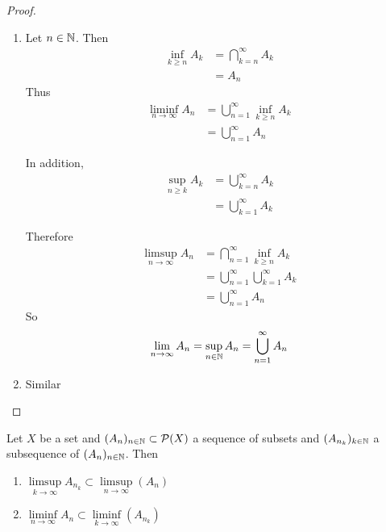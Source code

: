 \documentclass{book}
\begin{document}
	\begin{proof}\
		\begin{enumerate}
			\item Let $n \in \mathbb{N}$. Then 
			\begin{align*}
				\inf\limits_{k \geq n}A_k 
				&= \bigcap\limits_{k=n}^{\infty}A_k \\
				&= A_n
			\end{align*}
			Thus 
			\begin{align*}
				\liminf\limits_{n \rightarrow \infty}A_n 
				&= \bigcup\limits_{n=1}^{\infty} \inf\limits_{k \geq n}A_k \\
				&= \bigcup\limits_{n=1}^{\infty} A_n 
			\end{align*}  
			
			In addition,  
			\begin{align*}
				\sup\limits_{n \geq k} A_k 
				&= \bigcup_{k=n}^{\infty}A_k \\
				&= \bigcup_{k=1}^{\infty}A_k 
			\end{align*}
			
			Therefore 
			\begin{align*}
				\limsup\limits_{n \rightarrow \infty}A_n 
				&= \bigcap\limits_{n=1}^{\infty} \inf\limits_{k \geq n}A_k \\
				&= \bigcup\limits_{n=1}^{\infty} \bigcup_{k=1}^{\infty}A_k  \\
				&= \bigcup_{n=1}^{\infty}A_n
			\end{align*}
			So $$\lim\limits_{n \rightarrow \infty} A_n = \sup\limits_{n \in \mathbb{N}}A_n = \bigcup_{n =1}^{\infty}A_n$$
			
			\item Similar
		\end{enumerate}
	\end{proof}
	
	\begin{ex}  
		Let $X$ be a set and $(A_n)_{n \in \mathbb{N}} \subset \mathcal{P}(X)$ a sequence of subsets and $(A_{n_k})_{k \in \mathbb{N}}$ a subsequence of $(A_n)_{n \in \mathbb{N}}$. Then 
		\begin{enumerate}
			\item $\limsup\limits_{k \rightarrow \infty}A_{n_k} \subset \limsup\limits_{n \rightarrow \infty}(A_{n})$
			\item $\liminf \limits_{n \rightarrow \infty} A_{n} \subset \liminf\limits_{k \rightarrow \infty}(A_{n_k})$
		\end{enumerate}
	\end{ex}
	
\end{document}

